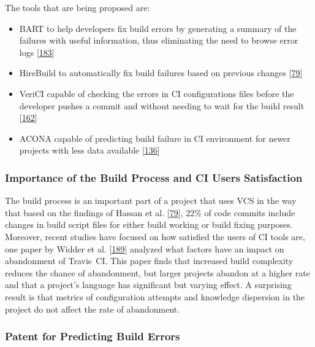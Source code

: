 \documentclass[]{book}
\providecommand{\tightlist}{%
  \setlength{\itemsep}{0pt}\setlength{\parskip}{0pt}}
\begin{document}
The tools that are being proposed are:

\begin{itemize}
\tightlist
\item
  BART to help developers fix build errors by generating a summary of
  the failures with useful information, thus eliminating the need to
  browse error logs {[}\protect\hyperlink{ref-vassallo2018break}{183}{]}
\item
  HireBuild to automatically fix build failures based on previous
  changes {[}\protect\hyperlink{ref-hassan2018hirebuild}{79}{]}
\item
  VeriCI capable of checking the errors in CI configurations files
  before the developer pushes a commit and without needing to wait for
  the build result
  {[}\protect\hyperlink{ref-santolucito2018statically}{162}{]}
\item
  ACONA capable of predicting build failure in CI environment for newer
  projects with less data available
  {[}\protect\hyperlink{ref-ni2018acona}{136}{]}
\end{itemize}

\subsubsection{Importance of the Build Process and CI Users
Satisfaction}\label{importance-of-the-build-process-and-ci-users-satisfaction}

The build process is an important part of a project that uses VCS in the
way that based on the findings of Hassan et al.
{[}\protect\hyperlink{ref-hassan2018hirebuild}{79}{]}, 22\% of code
commits include changes in build script files for either build working
or build fixing purposes. Moreover, recent studies have focused on how
satisfied the users of CI tools are, one paper by Widder et al.
{[}\protect\hyperlink{ref-widder2018m}{189}{]} analyzed what factors
have an impact on abandonment of Travis~CI. This paper finds that
increased build complexity reduces the chance of abandonment, but larger
projects abandon at a higher rate and that a project's language has
significant but varying effect. A surprising result is that metrics of
configuration attempts and knowledge dispersion in the project do not
affect the rate of abandonment.

\subsubsection{Patent for Predicting Build
Errors}\label{patent-for-predicting-build-errors}
\end{document}
